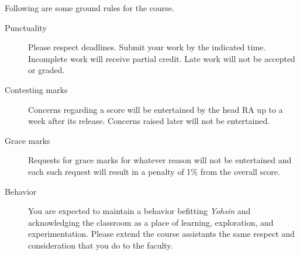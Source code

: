 \documentclass[a4paper]{article}
\begin{document}



Following are some ground rules for the course.
\begin{description}
\item[Punctuality] Please respect deadlines. Submit your work by the indicated time. Incomplete work will receive partial credit. Late work will not be accepted or graded.
\item[Contesting marks] Concerns regarding a score will be entertained by the head RA up to a week after its release. Concerns raised later will not be entertained.
\item[Grace marks] Requests for grace marks for whatever reason will not be entertained and each such request will result in a penalty of 1\% from the overall score.
\item[Behavior] You are expected to maintain a behavior befitting {\it Yohsin} and acknowledging the classroom as a place of learning, exploration, and experimentation. Please extend the course assistants the same respect and consideration that you do to the faculty.
\end{description}
\end{document}
